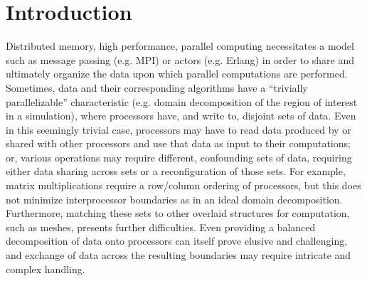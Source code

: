 \chapter{Introduction}
Distributed memory, high performance, parallel computing necessitates a model
such as message passing (e.g. MPI) or actors (e.g. Erlang) in order to share and
ultimately organize the data upon which parallel computations are performed.
Sometimes, data and their corresponding algorithms have a ``trivially
parallelizable'' characteristic (e.g. domain decomposition of the region of
interest in a simulation), where processors have, and write to, disjoint sets of
data. Even in this seemingly trivial case, processors may have to read data
produced by or shared with other processors and use that data as input to their
computations; or, various operations may require different, confounding sets of
data, requiring either data sharing across sets or a reconfiguration of those
sets. For example, matrix multiplications require a row/column ordering of
processors, but this does not minimize interprocessor boundaries as in an ideal
domain decomposition. Furthermore, matching these sets to other overlaid
structures for computation, such as meshes, presents further difficulties. Even
providing a balanced decomposition of data onto processors can itself prove
elusive and challenging, and exchange of data across the resulting boundaries may
require intricate and complex handling.

